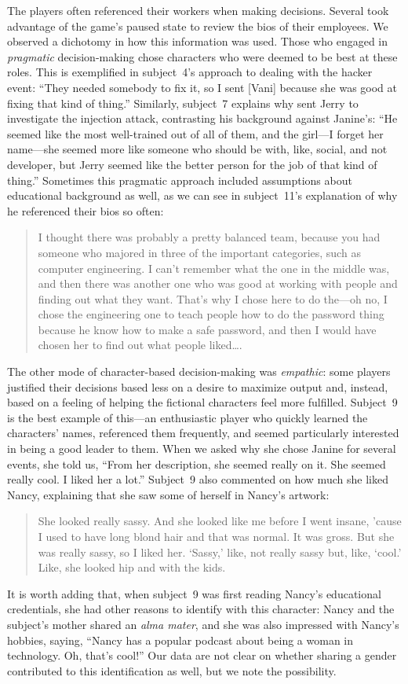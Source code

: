 \documentclass[letterpaper]{article}
\begin{document}
The players often referenced their workers when making decisions. Several
took advantage of the game's paused state to review the bios of their
employees. We observed a dichotomy in how this information was used.
Those who engaged in \textit{pragmatic} decision-making chose
characters who were deemed to be best at these roles. This is exemplified
in subject~4's approach to dealing with the hacker event:
``They needed somebody to fix it, so
I sent [Vani] because she was good at fixing that kind
of thing.'' Similarly, subject~7 explains why sent Jerry to investigate
the injection attack, contrasting his background against Janine's:
``He seemed like the most well-trained out of all of them,
and the girl---I forget her name---she seemed more like someone
who should be with, like, social, and not developer,
but Jerry seemed like the better person for the job of that kind of thing.''
Sometimes this pragmatic approach included assumptions about 
educational background as well, as we can see in subject~11's 
explanation of why he referenced their bios so often:
\begin{quote}
I thought there was probably a pretty balanced team, because you had
someone who majored in three of the important categories,
such as computer engineering.
I can't remember what the one in the middle was, and
then there was another one who was good at working with people and
finding out what they want. That's why I chose here to do the---oh no,
I chose the engineering one to teach people how to do the password thing because
he know how to make a safe password, and then I would have chosen her to
find out what people liked\ldots{}.
\end{quote}

The other mode of character-based decision-making was \textit{empathic}:
some players justified their decisions based less on a desire to
maximize output and, instead, based on a feeling of helping the
fictional characters feel more fulfilled.
Subject~9 is the best example of this---an enthusiastic player
who quickly learned the characters' names, referenced them frequently,
and seemed particularly interested in being a good leader to them.
When we asked why she chose Janine for several events, she told us, 
``From her description, she seemed really on it. She seemed really cool.
I liked her a lot.'' 
Subject~9 also commented on how much she liked Nancy, explaining that
she saw some of herself in Nancy's artwork:
\begin{quote}
She looked really sassy. And she looked like me before
I went insane, 'cause I used to have long blond hair and that was
normal. It was gross. But she was really sassy, so I liked her.
`Sassy,' like, not really sassy but, like, `cool.' Like, she looked hip
and with the kids.
\end{quote}
It is worth adding that, when subject~9 was first reading Nancy's 
educational credentials, she had other reasons to identify with
this character: Nancy and the subject's mother shared an \textit{alma mater},
and she was also impressed with Nancy's hobbies, saying, ``Nancy has a popular podcast about being a woman in technology. Oh, that's cool!'' 
Our data are not clear on whether sharing a gender contributed to this
identification as well, but we note the possibility.
\end{document}
